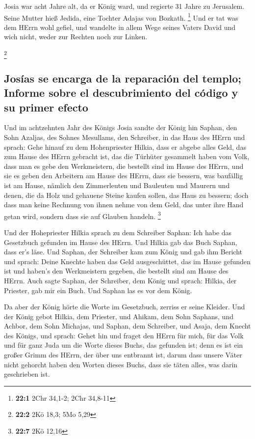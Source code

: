  Josia war acht Jahre alt, da er König ward, und regierte
31 Jahre zu Jerusalem. Seine Mutter hieß Jedida, eine Tochter Adajas von
Bozkath. \footnote{\textbf{22:1} 2Chr 34,1-2; 2Chr 34,8-11}
 Und er tat was dem HErrn wohl gefiel, und wandelte in
allem Wege seines Vaters David und wich nicht, weder zur Rechten noch
zur Linken.

\footnote{\textbf{22:2} 2Kö 18,3; 5Mo 5,29}

\hypertarget{josuxedas-se-encarga-de-la-reparaciuxf3n-del-templo-informe-sobre-el-descubrimiento-del-cuxf3digo-y-su-primer-efecto}{%
\subsection{Josías se encarga de la reparación del templo; Informe sobre
el descubrimiento del código y su primer
efecto}\label{josuxedas-se-encarga-de-la-reparaciuxf3n-del-templo-informe-sobre-el-descubrimiento-del-cuxf3digo-y-su-primer-efecto}}

 Und im achtzehnten Jahr des Königs Josia sandte der König
hin Saphan, den Sohn Azaljas, des Sohnes Mesullams, den Schreiber, in
das Haus des HErrn und sprach:  Gehe hinauf zu dem
Hohenpriester Hilkia, dass er abgebe alles Geld, das zum Hause des HErrn
gebracht ist, das die Türhüter gesammelt haben vom Volk, 
dass man es gebe den Werkmeistern, die bestellt sind im Hause des HErrn,
und sie es geben den Arbeitern am Hause des HErrn, dass sie bessern, was
baufällig ist am Hause,  nämlich den Zimmerleuten und
Bauleuten und Maurern und denen, die da Holz und gehauene Steine kaufen
sollen, das Haus zu bessern;  doch dass man keine Rechnung
von ihnen nehme von dem Geld, das unter ihre Hand getan wird, sondern
dass sie auf Glauben handeln. \footnote{\textbf{22:7} 2Kö 12,16}

 Und der Hohepriester Hilkia sprach zu dem Schreiber
Saphan: Ich habe das Gesetzbuch gefunden im Hause des HErrn. Und Hilkia
gab das Buch Saphan, dass er's läse.  Und Saphan, der
Schreiber kam zum König und gab ihm Bericht und sprach: Deine Knechte
haben das Geld ausgeschüttet, das im Hause gefunden ist und haben's den
Werkmeistern gegeben, die bestellt sind am Hause des HErrn.
 Auch sagte Saphan, der Schreiber, dem König und sprach:
Hilkia, der Priester, gab mir ein Buch. Und Saphan las es vor dem König.

 Da aber der König hörte die Worte im Gesetzbuch, zerriss
er seine Kleider.  Und der König gebot Hilkia, dem
Priester, und Ahikam, dem Sohn Saphans, und Achbor, dem Sohn Michajas,
und Saphan, dem Schreiber, und Asaja, dem Knecht des Königs, und sprach:
 Gehet hin und fraget den HErrn für mich, für das Volk
und für ganz Juda um die Worte dieses Buchs, das gefunden ist; denn es
ist ein großer Grimm des HErrn, der über uns entbrannt ist, darum dass
unsere Väter nicht gehorcht haben den Worten dieses Buchs, dass sie
täten alles, was darin geschrieben ist.

